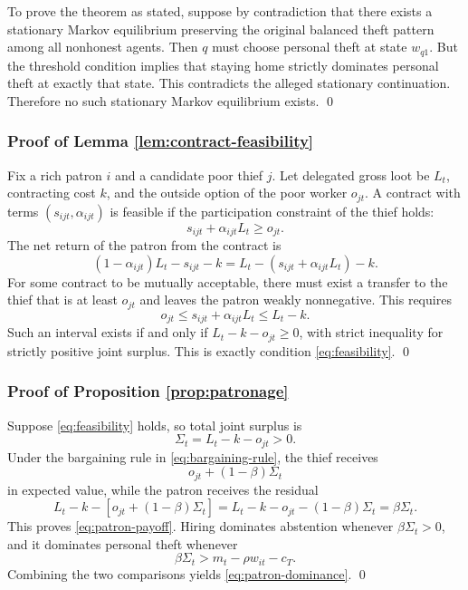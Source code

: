 To prove the theorem as stated, suppose by contradiction that there exists a stationary Markov equilibrium preserving the original balanced theft pattern among all nonhonest agents. Then $q$ must choose personal theft at state $w_{q1}$. But the threshold condition implies that staying home strictly dominates personal theft at exactly that state. This contradicts the alleged stationary continuation. Therefore no such stationary Markov equilibrium exists. \qed

\subsubsection*{Proof of Lemma \ref{lem:contract-feasibility}}

Fix a rich patron $i$ and a candidate poor thief $j$. Let delegated gross loot be $L_t$, contracting cost $k$, and the outside option of the poor worker $o_{jt}$. A contract with terms $(s_{ijt}, \alpha_{ijt})$ is feasible if the participation constraint of the thief holds:
\[
s_{ijt} + \alpha_{ijt}L_t \ge o_{jt}.
\]
The net return of the patron from the contract is
\[
(1-\alpha_{ijt})L_t - s_{ijt} - k = L_t - \left(s_{ijt} + \alpha_{ijt}L_t\right) - k.
\]
For some contract to be mutually acceptable, there must exist a transfer to the thief that is at least $o_{jt}$ and leaves the patron weakly nonnegative. This requires
\[
o_{jt} \le s_{ijt} + \alpha_{ijt}L_t \le L_t - k.
\]
Such an interval exists if and only if $L_t - k - o_{jt} \ge 0$, with strict inequality for strictly positive joint surplus. This is exactly condition \eqref{eq:feasibility}. \qed

\subsubsection*{Proof of Proposition \ref{prop:patronage}}

Suppose \eqref{eq:feasibility} holds, so total joint surplus is
\[
\Sigma_t = L_t - k - o_{jt} > 0.
\]
Under the bargaining rule in \eqref{eq:bargaining-rule}, the thief receives
\[
o_{jt} + (1-\beta)\Sigma_t
\]
in expected value, while the patron receives the residual
\[
L_t - k - \left[o_{jt} + (1-\beta)\Sigma_t\right]
 = L_t - k - o_{jt} - (1-\beta)\Sigma_t
 = \beta \Sigma_t.
\]
This proves \eqref{eq:patron-payoff}. Hiring dominates abstention whenever $\beta \Sigma_t > 0$, and it dominates personal theft whenever
\[
\beta \Sigma_t > m_t - \rho w_{it} - c_T.
\]
Combining the two comparisons yields \eqref{eq:patron-dominance}. \qed


